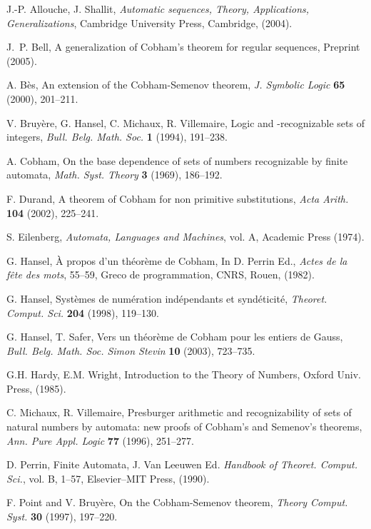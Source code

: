 \documentclass{beatcs}
\begin{document}
\begin{thebibliography}{99}
  
 J.-P. Allouche, J. Shallit, {\it Automatic sequences,
    Theory, Applications, Generalizations}, Cambridge University
  Press, Cambridge, (2004).
  
 J.~P. Bell, A generalization of Cobham's theorem for
  regular sequences, Preprint (2005).
  
 A. B\`es, An extension of the Cobham-Semenov theorem,
  {\it J. Symbolic Logic} {\bf 65} (2000), 201--211.
  
 V. Bruy\`ere, G. Hansel, C. Michaux, R. Villemaire,
  Logic and -recognizable sets of integers, {\it Bull. Belg. Math.
    Soc.} {\bf 1} (1994), 191--238.
  
 A. Cobham, On the base dependence of sets of numbers
  recognizable by finite automata, {\it Math. Syst. Theory} {\bf 3}
  (1969), 186--192.

 F. Durand, A theorem of Cobham for non primitive
  substitutions, {\it Acta Arith.} {\bf 104} (2002), 225--241.
  
 S. Eilenberg, {\it Automata, Languages and Machines},
  vol. A, Academic Press (1974).

 G. Hansel, \`A propos d'un th\'eor\`eme de Cobham, In D.
  Perrin Ed., {\it Actes de la f\^ete des mots}, 55--59, Greco de
  programmation, CNRS, Rouen, (1982).
  
 G. Hansel, Syst\`emes de num\'eration ind\'ependants et
  synd\'eticit\'e, {\it Theoret. Comput. Sci.} {\bf 204} (1998),
  119--130.
  
 G. Hansel, T. Safer, Vers un th\'eor\`eme de Cobham pour
  les entiers de Gauss, {\it Bull. Belg. Math. Soc.  Simon Stevin}
  {\bf 10} (2003), 723--735.
  
 G.H. Hardy, E.M. Wright, Introduction to the Theory of
  Numbers, Oxford Univ. Press, (1985).
  
 C. Michaux, R. Villemaire, Presburger arithmetic and
  recognizability of sets of natural numbers by automata: new proofs
  of Cobham's and Semenov's theorems, {\it Ann. Pure Appl. Logic} {\bf
    77} (1996), 251--277.
  
 D. Perrin, Finite Automata, J. Van Leeuwen Ed.
  {\it Handbook of Theoret. Comput. Sci.}, vol. B, 1--57,
  Elsevier--MIT Press, (1990).
  
 F. Point and V. Bruy\`ere, On the Cobham-Semenov theorem,
  {\it Theory Comput. Syst.} {\bf 30} (1997), 197--220.
  
\end{thebibliography}
\end{document}
